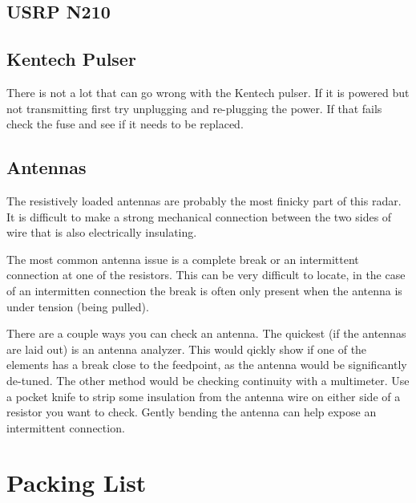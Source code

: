 \documentclass[titlepage]{article}
\begin{document}
\subsection{USRP N210} \label{trouble_usrp}


\subsection{Kentech Pulser} \label{trouble_xmit}
There is not a lot that can go wrong with the Kentech pulser. If it is powered but not transmitting first try unplugging and re-plugging the power. If that fails check the fuse and see if it needs to be replaced.

\subsection{Antennas} \label{trouble_ant}
The resistively loaded antennas are probably the most finicky part of this radar. It is difficult to make a strong mechanical connection between the two sides of wire that is also electrically insulating.

The most common antenna issue is a complete break or an intermittent connection at one of the resistors. This can be very difficult to locate, in the case of an intermitten connection the break is often only present when the antenna is under tension (being pulled).

There are a couple ways you can check an antenna. The quickest (if the antennas are laid out) is an antenna analyzer. This would qickly show if one of the elements has a break close to the feedpoint, as the antenna would be significantly de-tuned. The other method would be checking continuity with a multimeter. Use a pocket knife to strip some insulation from the antenna wire on either side of a resistor you want to check. Gently bending the antenna can help expose an intermittent connection.

\newpage
\section{Packing List}
\end{document}
